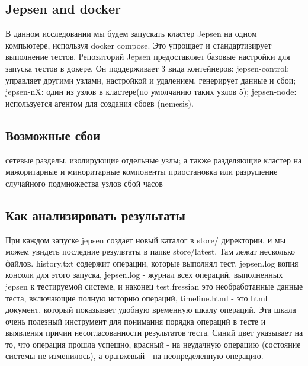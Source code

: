 \documentclass[12pt,  openany]{book}
\begin{document}
\subsection{Jepsen and docker}
В данном исследовании мы будем запускать кластер Jepsen на одном компьютере, используя docker compose. 
Это упрощает и стандартизирует выполнение тестов. 
Репозиторий Jepsen предоставляет базовые настройки для запуска тестов в докере. Он поддерживает 3 вида контейнеров:  \newline
jepsen-control:  управляет другими узлами, настройкой и удалением, генерирует данные и сбои; \newline
jepsen-nX:  один из узлов в кластере(по умолчанию таких узлов 5); \newline
jepsen-node: используется агентом для создания сбоев (nemesis). 

\subsection{Возможные сбои}
сетевые разделы, изолирующие отдельные узлы; а также разделяющие кластер на мажоритарные и миноритарные компоненты
приостановка или разрушение случайного подмножества узлов
сбой часов

\subsection{Как анализировать результаты}
При каждом запуске jepsen создает новый каталог в store/ директории, и мы можем увидеть последние результаты в папке store/latest. Там лежат несколько файлов. history.txt содержит операции, которые выполнял тест. jepsen.log копия консоли для этого запуска, jepsen.log - журнал всех операций, выполненных jepsen к тестируемой системе, и наконец test.fressian это необработанные данные теста, включающие полную историю операций, timeline.html - это html документ, который показывает удобную временную шкалу операций. Эта шкала очень полезный инструмент для понимания порядка операций в тесте и выявления причин несогласованности результатов теста.
Синий цвет указывает на то, что операция прошла успешно, красный - на неудачную операцию (состояние системы не изменилось), а оранжевый - на неопределенную операцию.
\end{document}
